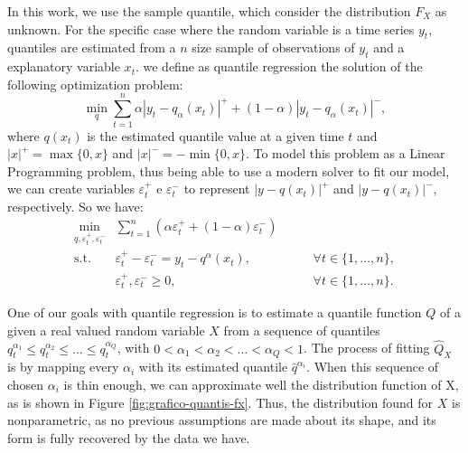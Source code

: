 In this work, we use the sample quantile, which consider the distribution $F_X$ as unknown. For the specific case where the random variable is a time series $y_t$, quantiles are estimated from a $n$ size sample of observations of $y_t$ and a explanatory variable $x_t$.  we define as quantile regression the solution of the following optimization problem:
\begin{equation}
\min_{q}\sum_{t=1}^{n}\alpha|y_{t}-q_\alpha(x_t)|^{+}+(1-\alpha)|y_{t}-q_\alpha(x_t)|^{-},
\label{eq:linear-model}
\end{equation}
where $q(x_t)$ is the estimated quantile value at a given time $t$ and $|x|^+=\max\{0,x\}$ and $|x|^-=-\min\{0,x\}$. To model this problem as a Linear Programming problem, thus being able to use a modern solver to fit our model,  we can create variables $\varepsilon^+_t$ e $\varepsilon^-_t$ to represent $|y-q(x_t)|^+$ and $|y-q(x_t)|^-$, respectively. So we have:
\begin{equation}
\begin{aligned}\min_{q,\varepsilon_{t}^{+}, \varepsilon_{t}^{-}} & \sum_{t=1}^{n}\left(\alpha \varepsilon_{t}^{+}+(1-\alpha)\varepsilon_{t}^{-}\right) & \\
\mbox{s.t. } & \varepsilon_{t}^{+}-\varepsilon_{t}^{-}=y_{t}-q^\alpha(x_{t}), & \qquad\forall t \in \{1,\dots,n\},\\
& \varepsilon_t^+,\varepsilon_t^- \geq 0, & \qquad \forall t \in \{1,\dots,n\}.
\end{aligned}
\label{eq:qar-general}
\end{equation}




One of our goals with quantile regression is to estimate a quantile function $Q$ of a given a real valued random variable $X$ from a sequence of quantiles $q^{\alpha_1}_{t} \leq q^{\alpha_2}_{t} \leq \dots \leq q^{\alpha_Q}_{t}$, with $0 < \alpha_1 < \alpha_2 < \dots < \alpha_Q < 1$. 
The process of fitting $\hat{Q}_X$ is by mapping every $\alpha_i$ with its estimated quantile $\hat{q}^{\alpha_i}$. 
When this sequence of chosen $\alpha_i$ is thin enough, we can approximate well the distribution function of X, as is shown in Figure \ref{fig:grafico-quantis-fx}. 
Thus, the distribution found for $X$ is nonparametric, as no previous assumptions are made about its shape, and its form is fully recovered by the data we have.
 
